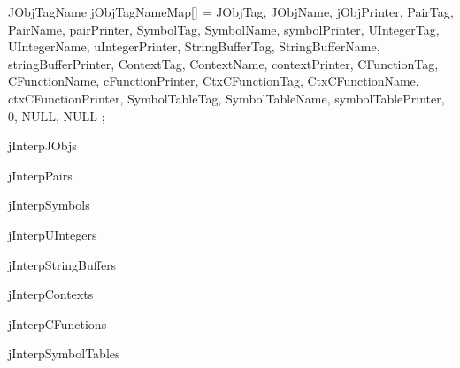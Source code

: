 \startCCode
JObjTagName jObjTagNameMap[] = {
  {JObjTag,         JObjName,         jObjPrinter},
  {PairTag,         PairName,         pairPrinter},
  {SymbolTag,       SymbolName,       symbolPrinter},
  {UIntegerTag,     UIntegerName,     uIntegerPrinter},
  {StringBufferTag, StringBufferName, stringBufferPrinter},
  {ContextTag,      ContextName,      contextPrinter},
  {CFunctionTag,    CFunctionName,    cFunctionPrinter},
  {CtxCFunctionTag, CtxCFunctionName, ctxCFunctionPrinter},
  {SymbolTableTag,  SymbolTableName,  symbolTablePrinter},
  {0,               NULL,             NULL}
};
\stopCCode

\diSimpComponent jInterpJObjs

\diSimpComponent jInterpPairs

\diSimpComponent jInterpSymbols

\diSimpComponent jInterpUIntegers

\diSimpComponent jInterpStringBuffers

\diSimpComponent jInterpContexts

\diSimpComponent jInterpCFunctions

\diSimpComponent jInterpSymbolTables
